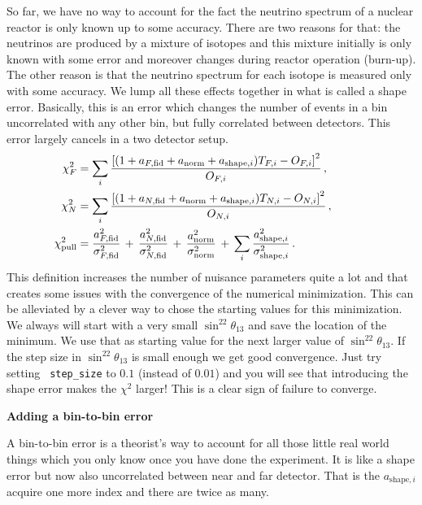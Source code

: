\documentclass[12pt,a4paper]{article}
\newcommand{\aufg}[1]{\vspace{4mm}{\bf\underline{Problem #1:}}\vspace{3mm}}
\begin{document}
So far, we have no way to account for the fact the neutrino spectrum
of  a nuclear reactor is only known up to some accuracy. There are two
reasons for that: the neutrinos are produced by a mixture of isotopes
and this mixture initially is only known with some error and moreover
changes during reactor operation (burn-up). The other reason is that
the neutrino spectrum for each isotope is measured only with some
accuracy. We lump all these effects together in what is called a shape
error. Basically, this is an error which changes the number of events
in a bin uncorrelated with any other bin, but fully correlated between
detectors. This error largely cancels in a two detector setup.
\begin{align}
  \hspace{-1cm} \chi^2_{F} &= \sum_i
     \frac{\left[ (1 + a_{F,\rm fid} + a_{\rm norm} + a_{\mathrm{shape}, i}) T_{F,i}
        - O_{F,i} \right]^2}{O_{F,i}}      \, ,    \\
  \hspace{-1 cm} \chi^2_{N} &= \sum_i
    \frac{\left[ (1 + a_{N,\rm fid} + a_{\rm norm}+ a_{\mathrm{shape},i}) T_{N,i}
       - O_{N,i} \right]^2}{O_{N,i}}     \, ,    \ \\
  \hspace{-1 cm} \chi^2_\mathrm{pull} &= \frac{a_{F,\rm fid}^2}{\sigma_{F,\rm fid}^2}
       \, +\, \frac{a_{N,\rm fid}^2}{\sigma_{N,\rm fid}^2}
       \, +\, \frac{a_{\rm norm}^2}{\sigma_{\rm norm}^2}
       \, +\, \sum_i \frac{a_{\mathrm{shape},i}^2}{\sigma_{\mathrm{shape},i}^2}\, .      
\end{align}
This definition increases the number of nuisance parameters quite a
lot and that creates some issues with the convergence of the numerical
minimization. This can be alleviated by a clever way to chose the
starting values for this minimization. We always will start with a
very small $\sin^22\theta_{13}$ and save the location of the minimum.
We use that as starting value for the next larger value of
$\sin^22\theta_{13}$. If the step size in $\sin^22\theta_{13}$ is
small enough we get good convergence. Just try setting {\tt
  step\_size} to $0.1$ (instead of $0.01$) and you will see that
introducing the shape error makes the $\chi^2$ larger! This is a clear
sign of failure to converge.

\aufg{4} {\bf Adding a bin-to-bin error}

A bin-to-bin error is a theorist's way to account for all those little
real world things which you only know once you have done the
experiment. It is like a shape error but now also uncorrelated between
near and far detector. That is the $a_{\mathrm{shape},i}$ acquire one more
index and there are twice as many. 
\end{document}

